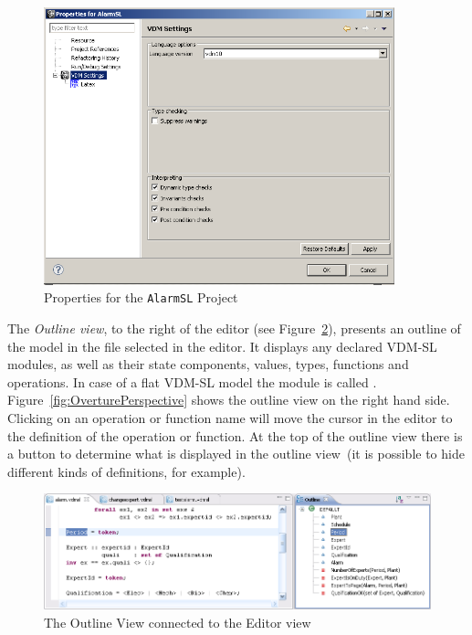 {\begin{figure}[!htb]
\begin{center}
  \includegraphics[width=4.0in]{figures/settings}
  \caption[labelInTOC]{Properties for the \texttt{AlarmSL} Project}
  \label{fig:settings}
\end{center}
\end{figure}


The \emph{Outline view}, to the right of the editor (see
Figure~\ref{fig:OutlineView}), presents an outline of the
model in the file selected in the editor. It displays any declared
VDM-SL modules, as well as their state components, values, types,
functions and operations. In case of a flat VDM-SL model the module is
called {}.
Figure~\ref{fig:OverturePerspective} shows the outline view
on the right hand side. Clicking on an operation or function name will
move the cursor in the editor to the definition of the operation or function. At
the top of the outline view there is a button to determine what is
displayed in the outline view~(it is possible to hide different kinds
of definitions, for
example).

\begin{figure}[!htb]
\begin{center}
  \includegraphics[width=4.5in]{figures/OutlineView}
  \caption[labelInTOC]{The Outline View connected to the Editor view}
  \label{fig:OutlineView}
\end{center}
\end{figure}

}
